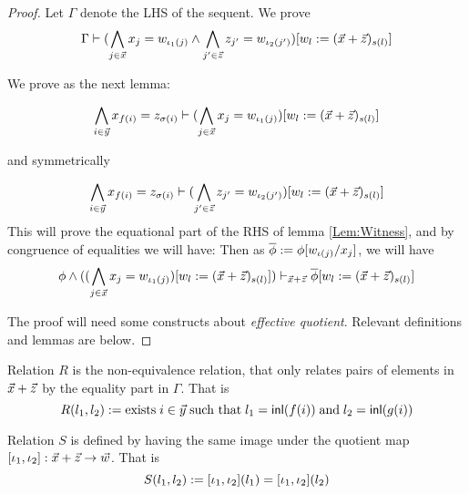 \begin{proof}
  Let $\Gamma$ denote the LHS of the sequent. We prove 
  \begin{equation*}
    \Gamma \vdash (\bigwedge_{j\in\vec{x}}x_j = w_{\iota_1(j)}\land \bigwedge_{j'\in\vec{z}}z_{j'}= w_{\iota_2(j')}) [w_l:=(\vec{x}+\vec{z})_{s(l)}] 
  \end{equation*}

  We prove as the next lemma:
  
  \begin{equation*}
   \bigwedge_{i\in \vec{y}} x_{f(i)} = z_{\sigma(i)} \vdash 
    (\bigwedge_{j\in\vec{x}}x_j = w_{\iota_1(j)}) [w_l:=(\vec{x}+\vec{z})_{s(l)}] 
  \end{equation*}

  and symmetrically

  \begin{equation*}
    \bigwedge_{i\in \vec{y}} x_{f(i)} = z_{\sigma(i)} \vdash 
    (\bigwedge_{j'\in\vec{z}}z_{j'}= w_{\iota_2(j')}) [w_l:=(\vec{x}+\vec{z})_{s(l)}] 
  \end{equation*}
  This will prove the equational part of the RHS of lemma \ref{Lem:Witness}, and by congruence of equalities we will have:
  Then as $\overline{\phi} := \phi[w_{\iota(j)}/x_j]$, we will have 
  \begin{equation*}
    \phi\land ((\bigwedge_{j\in\vec{x}}x_j = w_{\iota_1(j)})[w_l:=(\vec{x}+\vec{z})_{s(l)}])  \vdash_{\vec{x} + \vec{z}} \overline{\phi} [w_l:=(\vec{x}+\vec{z})_{s(l)}] 
  \end{equation*}

  
  The proof will need some constructs about \emph{effective quotient}. Relevant definitions and lemmas are below.

  



\end{proof}


\begin{definition}
  Relation $R$ is the non-equivalence relation, that only relates pairs of elements in $\vec{x}+\vec{z}$ 
  by the equality part in $\Gamma$. That is 
  \begin{equation}
    R(l_1,l_2):= \text{exists}\; i \in \vec{y} \;\text{such that}\; l_1 = \mathsf{inl}(f(i))\; \text{and}\;  l_2 = \mathsf{inl}(g(i))
  \end{equation}
\end{definition}

\begin{definition}
  Relation $S$ is defined by having the same image under the quotient map $[\iota_1,\iota_2]:\vec{x}+\vec{z}\to \vec{w}$. That is 
  \begin{equation}
    S(l_1,l_2):= [\iota_1,\iota_2](l_1) = [\iota_1,\iota_2](l_2)
  \end{equation}
\end{definition}

